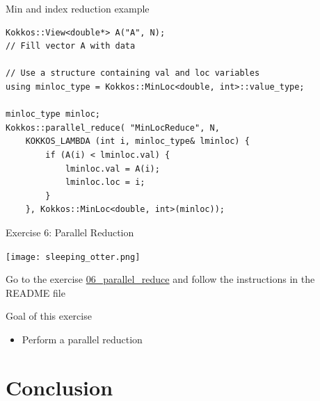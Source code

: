 \documentclass[aspectratio=169]{beamer}
\begin{document}

\begin{frame}[fragile]{Min and index reduction example}
    \begin{verbatim}
Kokkos::View<double*> A("A", N);
// Fill vector A with data

// Use a structure containing val and loc variables
using minloc_type = Kokkos::MinLoc<double, int>::value_type;

minloc_type minloc;
Kokkos::parallel_reduce( "MinLocReduce", N,
    KOKKOS_LAMBDA (int i, minloc_type& lminloc) {
        if (A(i) < lminloc.val) {
            lminloc.val = A(i);
            lminloc.loc = i;
        }
    }, Kokkos::MinLoc<double, int>(minloc));
    \end{verbatim}
\end{frame}


\begin{frame}{Exercise 6: Parallel Reduction}
    \begin{center}
        \texttt{[image: sleeping\_otter.png]}
    \end{center}

    Go to the exercise \href{https://github.com/CExA-project/cexa-kokkos-tutorials/tree/main/exercises/06_parallel_reduce}{06\_parallel\_reduce} and follow the instructions in the README file

    \begin{block}{Goal of this exercise}
        \begin{itemize}
            \item Perform a parallel reduction
        \end{itemize}
    \end{block}
\end{frame}


\section[Conclusion]{Conclusion}

\end{document}
